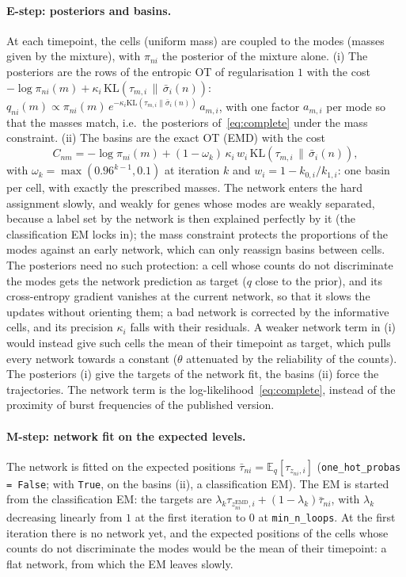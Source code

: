 \documentclass[a4paper, 11pt]{article}
\newcommand{\E}{\mathbb{E}}
\theoremstyle{plain}
\theoremstyle{remark}
\begin{document}
\paragraph{E-step: posteriors and basins.} At each timepoint, the cells (uniform mass) are coupled to the modes (masses given by the mixture), with $\pi_{ni}$ the posterior of the mixture alone. (i) The posteriors are the rows of the entropic OT of regularisation $1$ with the cost $-\log\pi_{ni}(m) + \kappa_i\,\mathrm{KL}(\tau_{m,i}\,\|\,\bar\sigma_i(n))$: $q_{ni}(m) \propto \pi_{ni}(m)\, e^{-\kappa_i \mathrm{KL}(\tau_{m,i}\|\bar\sigma_i(n))}\, a_{m,i}$, with one factor $a_{m,i}$ per mode so that the masses match, i.e.\ the posteriors of~\eqref{eq:complete} under the mass constraint. (ii) The basins are the exact OT (EMD) with the cost
\begin{equation}\label{eq:costs}
C_{nm} = -\log\pi_{ni}(m) + (1 - \omega_k)\,\kappa_i\, w_i\, \mathrm{KL}(\tau_{m,i} \,\|\, \bar\sigma_i(n)),
\end{equation}
with $\omega_k = \max(0.96^{k-1}, 0.1)$ at iteration $k$ and $w_i = 1 - k_{0,i}/k_{1,i}$: one basin per cell, with exactly the prescribed masses. The network enters the hard assignment slowly, and weakly for genes whose modes are weakly separated, because a label set by the network is then explained perfectly by it (the classification EM locks in); the mass constraint protects the proportions of the modes against an early network, which can only reassign basins between cells. The posteriors need no such protection: a cell whose counts do not discriminate the modes gets the network prediction as target ($q$ close to the prior), and its cross-entropy gradient vanishes at the current network, so that it slows the updates without orienting them; a bad network is corrected by the informative cells, and its precision $\kappa_i$ falls with their residuals. A weaker network term in (i) would instead give such cells the mean of their timepoint as target, which pulls every network towards a constant ($\theta$ attenuated by the reliability of the counts). The posteriors (i) give the targets of the network fit, the basins (ii) force the trajectories. The network term is the log-likelihood~\eqref{eq:complete}, instead of the proximity of burst frequencies of the published version.

\paragraph{M-step: network fit on the expected levels.} The network is fitted on the expected positions $\bar\tau_{ni} = \E_{q}[\tau_{z_{ni},i}]$ (\texttt{one\_hot\_probas = False}; with \texttt{True}, on the basins (ii), a classification EM). The EM is started from the classification EM: the targets are $\lambda_k\tau_{z^{\mathrm{EMD}}_{ni},i} + (1 - \lambda_k)\bar\tau_{ni}$, with $\lambda_k$ decreasing linearly from $1$ at the first iteration to $0$ at \texttt{min\_n\_loops}. At the first iteration there is no network yet, and the expected positions of the cells whose counts do not discriminate the modes would be the mean of their timepoint: a flat network, from which the EM leaves slowly.
\end{document}
